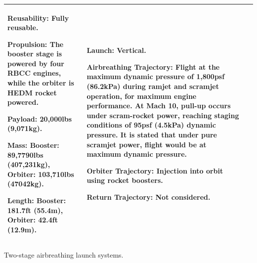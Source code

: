 {\begin{landscape}
\begin{xltabular}{\linewidth}{|X|X|X|}
	\textbf{Reusability:} Fully reusable. 
	
	\textbf{Propulsion:} The booster stage is powered by four RBCC engines, while the orbiter is HEDM rocket powered. 
	
	\textbf{Payload:} 20,000lbs (9,071kg).
	
	\textbf{Mass:} Booster: 89,7790lbs (407,231kg), Orbiter: 103,710lbs (47042kg).  
	
	\textbf{Length:} Booster: 181.7ft (55.4m), Orbiter: 42.4ft (12.9m).
	&\small
	
	\textbf{Launch:} Vertical.
	
	\textbf{Airbreathing Trajectory:} Flight at the maximum dynamic pressure of 1,800psf (86.2kPa) during ramjet and scramjet operation, for maximum engine performance. 
	At Mach 10, pull-up occurs under scram-rocket power, reaching staging conditions of 95psf (4.5kPa) dynamic pressure. It is stated that under pure scramjet power, flight would be at maximum dynamic pressure. 
	
	\textbf{Orbiter Trajectory:} Injection into orbit using rocket boosters. 
	
	
\textbf{Return Trajectory:} Not considered. 
	\\
\hline 
\end{xltabular} 


\begin{table}[H]
	
	
	\caption{Two-stage airbreathing launch systems.}
	\label{tab:twostage}
\end{table}

\end{landscape}
}
